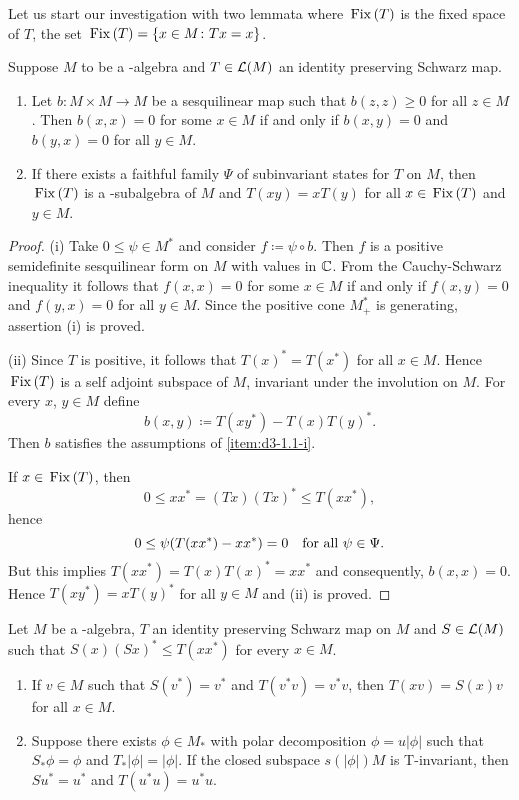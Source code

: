 Let us start our investigation with two lemmata where $ \mathop{}\mathrm{Fix}\left(T\right) $ is the fixed space of $T$, \ie the set $ \mathop{}\mathrm{Fix}\left(T\right) = \{x\in M \colon Tx=x \}$.
\begin{lemma}\label{lem:d3-1.1}
Suppose $M$ to be a \CA-algebra and $ T \in \mathcal{L}(M) $ an identity preserving Schwarz map.
\begin{enumerate}[\upshape (i), wide, labelindent=.5em]

\item\label{item:d3-1.1-i}
Let $ b \colon M \times M \to M $ be a sesquilinear map such that $ b(z,z) \geq 0 $ for all $ z \in M $.
Then $ b(x,x) = 0 $ for some $x\in M$ if and only if $b(x,y) = 0$ and $b(y,x) = 0$ for all $y\in M$.

\item\label{item:d3-1.1-ii}
If there exists a faithful family $\Psi$ of subinvariant states for $T$ on $M$, then $\mathop{}\mathrm{Fix}\left(T\right)$ is a \CA-subalgebra of $M$ and $T(xy) = xT(y)$ for all $ x \in \mathop{}\mathrm{Fix}\left(T\right) $ and $ y \in M $.

\end{enumerate}
\end{lemma}
\begin{proof} 
(i) Take $0 \leq \psi \in M^{*}$ and consider $f \coloneqq \psi\circ b$.
Then $f$ is a positive semidefinite sesquilinear form on $M$ with values in $\mathbb{C}$.
From the Cauchy-Schwarz inequality it follows that $f(x,x) = 0$ for some $x\in M$ if and only if $f(x,y) = 0$ and $f(y,x) = 0$ for all $y\in M$.
Since the positive cone $M^{*}_{+}$ is generating, assertion (i) is proved.

(ii) Since $T$ is positive,  it follows that $T(x)^{*} = T(x^{*})$ for all $x \in M$.
Hence $\mathop{}\mathrm{Fix}\left(T\right)$ is a self adjoint subspace of $M$, \ie invariant under the involution on $M$.
For every $x$, $ y \in M $ define
\[
	b(x,y) \coloneqq T(xy^{*}) - T(x)T(y)^{*}.
\]
Then $b$ satisfies the assumptions of \ref{item:d3-1.1-i}.

If $x\in\mathop{}\mathrm{Fix}\left(T\right)$, then
\[
0 \leq xx^{*} = (Tx)(Tx)^{*} \leq T(xx^{*}),
\]
hence
\[
0 \leq \psi(T(xx^{*}) - xx^{*}) = 0 \quad \text{for all $ \psi\in\Psi $.} 
\]
But this implies $T(xx^{*}) = T(x)T(x)^{*} = xx^{*}$ and consequently, $b(x,x) = 0$.
Hence $T(xy^{*}) = xT(y)^{*}$ for all $y\in M$ and (ii) is proved.
\end{proof}
\begin{lemma}\label{lem:d3-1.2}
Let $M$ be a \WA-algebra, $T$ an identity preserving Schwarz map on $M$ and $S\in\mathcal{L}(M)$ such that $S(x)(Sx)^{*} \leq T(xx^{*})$ for every $x\in M$.
\begin{enumerate}[\upshape (i)]

\item\label{item:d3-1.2-i}
If $v\in M$ such that $S(v^{*}) = v^{*}$ and $T(v^{*}v) = v^{*}v$, then $T(xv) = S(x)v$ for all $x\in M$.

\item\label{item:d3-1.2-ii}
Suppose there exists $\phi\in M_{*}$ with polar decomposition $\phi = u|\phi|$ such that $S_{*}\phi = \phi$ and $T_{*}|\phi| = |\phi|$.
If the closed subspace $s(|\phi|)M$ is T-invariant, then $Su^{*} = u^{*}$ and $T(u^{*}u) = u^{*}u$.
\end{enumerate}
\end{lemma}
